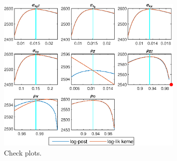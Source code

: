  
\begin{figure}[H]
\centering 
\includegraphics[width=0.80\textwidth]{BRS_growth/graphs/BRS_growth_CheckPlots1}
\caption{Check plots.}\label{Fig:CheckPlots:1}
\end{figure}
 
